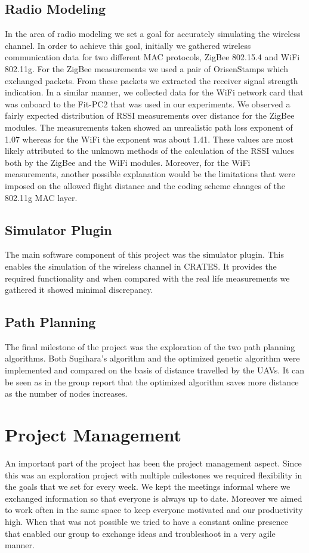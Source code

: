 \subsection{Radio Modeling}
In the area of radio modeling we set a goal for accurately simulating the
wireless channel. In order to achieve this goal, initially we gathered wireless
communication data for two different MAC protocols, ZigBee 802.15.4 and WiFi
802.11g. For the ZigBee measurements we used a pair of OrisenStamps which exchanged
packets. From these packets we extracted the receiver signal strength
indication. In a similar manner, we collected data for the WiFi network card that
was onboard to the Fit-PC2 that was used in our experiments. We observed a
fairly expected distribution of RSSI measurements over distance for the ZigBee
modules. The measurements taken showed an unrealistic path loss exponent of 1.07
whereas for the WiFi the exponent was about 1.41. These values are most likely
attributed to the unknown methods of the calculation of the RSSI values both by
the ZigBee and the WiFi modules. Moreover, for the WiFi measurements, another
possible explanation would be the limitations that were imposed on the allowed
flight distance and the coding scheme changes of the 802.11g MAC layer.
\subsection{Simulator Plugin}
The main software component of this project was the simulator plugin. This
enables the simulation of the wireless channel in CRATES. It provides the
required functionality and when compared with the real life measurements we
gathered it showed minimal discrepancy.
\subsection{Path Planning}
The final milestone of the project was the exploration of the two path planning
algorithms. Both Sugihara's algorithm and the optimized genetic algorithm were
implemented and compared on the basis of distance travelled by the UAVs. It can
be seen as in the group report that the optimized algorithm saves more distance
as the number of nodes increases.

\section{Project Management}
An important part of the project has been the project management aspect. Since
this was an exploration project with multiple milestones we required flexibility
in the goals that we set for every week. We kept the meetings informal where we
exchanged information so that everyone is always up to date. Moreover we aimed
to work often in the same space to keep everyone motivated and our productivity
high. When that was not possible we tried to have a constant online presence
that enabled our group to exchange ideas and troubleshoot in a very agile
manner.

